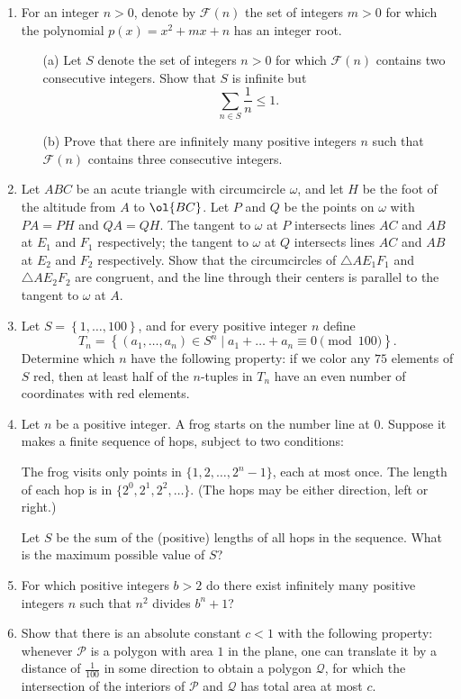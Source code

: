 \documentclass[11pt]{scrartcl}
\begin{document}
\begin{enumerate}[\bfseries 1.]
\item %
For an integer $n > 0$,
denote by $\mathcal F(n)$ the set of integers $m > 0$ for which
the polynomial $p(x) = x^2 + mx + n$ has an integer root.
\begin{enumerate}
\item [(a)] Let $S$ denote the set of integers $n > 0$
  for which $\mathcal F(n)$ contains two consecutive integers.
  Show that $S$ is infinite but
  \[ \sum_{n \in S} \frac 1n \le 1. \]
\item [(b)] Prove that there are infinitely many positive integers $n$
  such that $\mathcal F(n)$ contains three consecutive integers.
\end{enumerate}

\item %
Let $ABC$ be an acute triangle with circumcircle $\omega$,
and let $H$ be the foot of the altitude from $A$ to $\ol{BC}$.
Let $P$ and $Q$ be the points on $\omega$ with $PA = PH$ and $QA = QH$.
The tangent to $\omega$ at $P$ intersects lines $AC$ and $AB$
at $E_1$ and $F_1$ respectively; the tangent to $\omega$ at $Q$
intersects lines $AC$ and $AB$ at $E_2$ and $F_2$ respectively.
Show that the circumcircles of $\triangle AE_1F_1$ and $\triangle AE_2F_2$
are congruent, and the line through their centers
is parallel to the tangent to $\omega$ at $A$.

\item %
Let $S = \left\{ 1, \dots, 100 \right\}$,
and for every positive integer $n$ define
\[
  T_n = \left\{ (a_1, \dots, a_n) \in S^n
    \mid a_1 + \dots + a_n \equiv 0 \pmod{100} \right\}.
\]
Determine which $n$ have the following property:
if we color any $75$ elements of $S$ red,
then at least half of the $n$-tuples in $T_n$
have an even number of coordinates with red elements.

\item %
Let $n$ be a positive integer.
A frog starts on the number line at $0$.
Suppose it makes a finite sequence of hops, subject to two conditions:
\begin{itemize}
  \ii The frog visits only points in $\{1, 2, \dots, 2^n-1\}$,
  each at most once.
  \ii The length of each hop is in $\{2^0, 2^1, 2^2, \dots\}$.
  (The hops may be either direction, left or right.)
\end{itemize}
Let $S$ be the sum of the (positive) lengths of all hops in the sequence.
What is the maximum possible value of $S$?

\item %
For which positive integers $b > 2$ do there exist
infinitely many positive integers $n$
such that $n^2$ divides $b^n+1$?

\item %
Show that there is an absolute constant $c < 1$
with the following property:
whenever $\mathcal P$ is a polygon with area $1$ in the plane,
one can translate it by a distance of $\frac{1}{100}$ in some direction
to obtain a polygon $\mathcal Q$, for which
the intersection of the interiors of $\mathcal P$ and $\mathcal Q$
has total area at most $c$.

\end{enumerate}
\pagebreak
\end{document}

